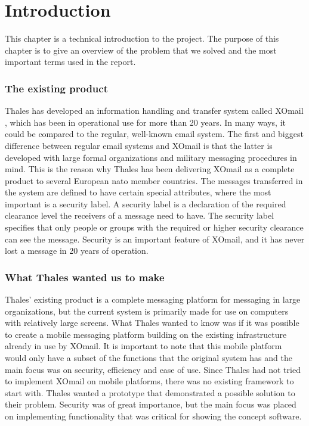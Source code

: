 \chapter{Introduction}

This chapter is a technical introduction to the project. The purpose of this chapter is to give an overview of the problem that we solved and the most important terms used in the report.

\subsection*{The existing product}
Thales has developed an information handling and transfer system called XOmail \cite{bib:xomail}, which has been in operational use for more than 20 years. In many ways, it could be compared to the regular, well-known email system. The first and biggest difference between regular email systems and XOmail is that the latter is developed with large formal organizations and military messaging procedures in mind. This is the reason why Thales has been delivering XOmail as a complete product to several European \gls{nato} member countries.  
\newline
\newline
The messages transferred in the system are defined to have certain special attributes, where the most important is a security label. A security label is a declaration of the required clearance level the receivers of a message need to have. The security label specifies that only people or groups with the required or higher security clearance can see the message. Security is an important feature of XOmail, and it has never lost a message in 20 years of operation.

\subsection*{What Thales wanted us to make}
Thales’ existing product is a complete messaging platform for messaging in large organizations, but the current system is primarily made for use on computers with relatively large screens. What Thales wanted to know was if it was possible to create a mobile messaging platform building on the existing infrastructure already in use by XOmail. It is important to note that this mobile platform would  only have a subset of the functions that the original system has and the main focus was on security, efficiency and ease of use.
\newline
\newline
Since Thales had not tried to implement XOmail on mobile platforms, there was no existing framework to start with. Thales wanted a prototype that demonstrated a possible solution to their problem. Security was of great importance, but the main focus was placed on implementing functionality that was critical for showing the concept software.  

